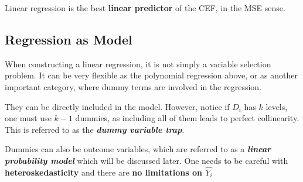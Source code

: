 Linear regression is the best \textbf{linear predictor} of the CEF, in the MSE sense.

\subsection{Regression as Model}
When constructing a linear regression, it is not simply a variable selection problem. It can be very flexible as the polynomial regression above, or as another important category, where dummy terms are involved in the regression.

They can be directly included in the model. However, notice if $D_i$ has $k$ levels, one must use $k - 1$ dummies, as including all of them leads to perfect collinearity. This is referred to as the \textbf{\textit{dummy variable trap}}.

Dummies can also be outcome variables, which are referred to as a \textbf{\textit{linear probability model}} which will be discussed later. One needs to be careful with \textbf{heteroskedasticity} and there are \textbf{no limitations on $\hat{Y_i}$}

\newpage